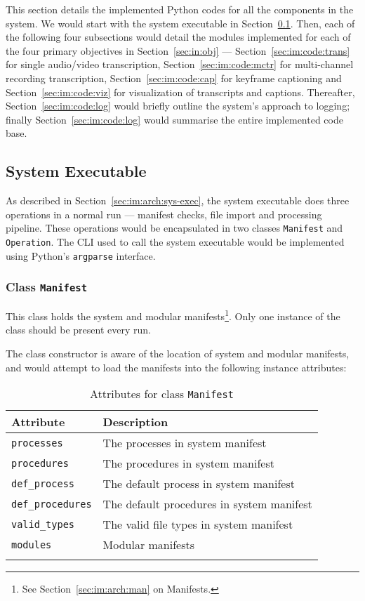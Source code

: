 This section details the implemented Python codes for all the components
in the system. We would start with the system executable in
Section~\ref{sec:im:code:sys}. Then, each of the following four subsections
would detail the modules implemented for each of the four primary
objectives in Section~\ref{sec:in:obj} ---
Section~\ref{sec:im:code:trans} for single audio/video transcription,
Section~\ref{sec:im:code:mctr} for multi-channel recording transcription,
Section~\ref{sec:im:code:cap} for keyframe captioning and
Section~\ref{sec:im:code:viz} for visualization of transcripts and captions.
Thereafter, Section~\ref{sec:im:code:log} would briefly outline the system's
approach to logging; finally Section~\ref{sec:im:code:log} would summarise 
the entire implemented code base.

\subsection{System Executable}\label{sec:im:code:sys}

As described in Section~\ref{sec:im:arch:sys-exec}, the system executable
does three operations in a normal run --- manifest checks, file import and
processing pipeline. These operations would be encapsulated in two classes
\texttt{Manifest} and \texttt{Operation}. The CLI used to call the system
executable would be implemented using Python's \texttt{argparse} interface.

\subsubsection{Class \texttt{Manifest}}

This class holds the system and modular manifests\footnote{See
Section~\ref{sec:im:arch:man} on Manifests.}. Only one instance of the
class should be present every run.

The class constructor is aware of the location of system and modular
manifests, and would attempt to load the manifests into the following
instance attributes:

\begin{longtabu}{X[1,l]X[3,l]}
    \textbf{Attribute} & \textbf{Description} \\
    \midrule
    \endhead{}
    \texttt{processes} &
    The processes in system manifest \\
    \texttt{procedures} &
    The procedures in system manifest \\
    \texttt{def\_process} &
    The default process in system manifest \\
    \texttt{def\_procedures} &
    The default procedures in system manifest \\
    \texttt{valid\_types} &
    The valid file types in system manifest \\
    \texttt{modules} & 
    Modular manifests \\
    \caption{Attributes for class \texttt{Manifest}}
\end{longtabu}

